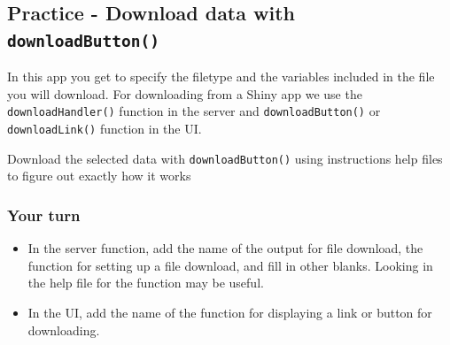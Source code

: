 \documentclass[
  letterpaper,
  DIV=11,
  numbers=noendperiod]{scrreprt}
\newenvironment{Shaded}{\begin{snugshade}}{\end{snugshade}}
\newcommand{\AttributeTok}[1]{\textcolor[rgb]{0.40,0.46,0.14}{#1}}
\newcommand{\CommentTok}[1]{\textcolor[rgb]{0.37,0.37,0.37}{#1}}
\newcommand{\ConstantTok}[1]{\textcolor[rgb]{0.56,0.35,0.01}{#1}}
\newcommand{\DecValTok}[1]{\textcolor[rgb]{0.68,0.00,0.00}{#1}}
\newcommand{\FunctionTok}[1]{\textcolor[rgb]{0.28,0.35,0.67}{#1}}
\newcommand{\NormalTok}[1]{\textcolor[rgb]{0.00,0.46,0.62}{#1}}
\newcommand{\OtherTok}[1]{\textcolor[rgb]{0.00,0.46,0.62}{#1}}
\newcommand{\SpecialCharTok}[1]{\textcolor[rgb]{0.37,0.37,0.37}{#1}}
\providecommand{\tightlist}{%
  \setlength{\itemsep}{0pt}\setlength{\parskip}{0pt}}
\begin{document}
\begin{Shaded}
\end{Shaded}

\hypertarget{practice---download-data-with-downloadbutton}{%
\subsection{\texorpdfstring{Practice - Download data with
\texttt{downloadButton()}}{Practice - Download data with downloadButton()}}\label{practice---download-data-with-downloadbutton}}

In this app you get to specify the filetype and the variables included
in the file you will download. For downloading from a Shiny app we use
the \texttt{downloadHandler()} function in the server and
\texttt{downloadButton()} or \texttt{downloadLink()} function in the UI.

Download the selected data with \texttt{downloadButton()} using
instructions help files to figure out exactly how it works

\hypertarget{your-turn-15}{%
\subsubsection{Your turn}\label{your-turn-15}}

\begin{itemize}
\tightlist
\item
  In the server function, add the name of the output for file download,
  the function for setting up a file download, and fill in other blanks.
  Looking in the help file for the function may be useful.
\item
  In the UI, add the name of the function for displaying a link or
  button for downloading.
\end{itemize}
\end{document}
